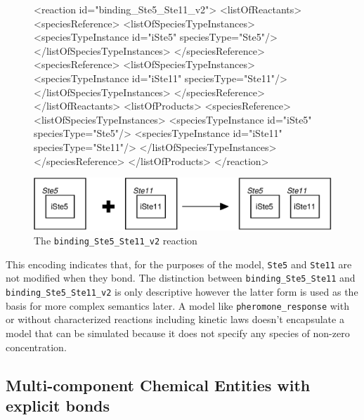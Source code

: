 \documentclass{cekarticle}
\begin{document}
\begin{figure}[h]
\begin{example}
<reaction id="binding_Ste5_Ste11_v2">
    <listOfReactants>
        <speciesReference>
            <listOfSpeciesTypeInstances>
                <speciesTypeInstance id="iSte5" speciesType="Ste5"/>
            </listOfSpeciesTypeInstances>
        </speciesReference>
        <speciesReference>
            <listOfSpeciesTypeInstances>
                <speciesTypeInstance id="iSte11" speciesType="Ste11"/>
            </listOfSpeciesTypeInstances>
        </speciesReference>
    </listOfReactants>
    <listOfProducts>
        <speciesReference>
            <listOfSpeciesTypeInstances>
                <speciesTypeInstance id="iSte5" speciesType="Ste5"/>
                <speciesTypeInstance id="iSte11" speciesType="Ste11"/>
            </listOfSpeciesTypeInstances>
        </speciesReference>
    </listOfProducts>
</reaction>
\end{example}
  \vspace*{8pt}
  \centering
  \includegraphics[scale = 0.7]{binding_Ste5_Ste11_v2.eps}
  \caption{The \texttt{binding\_Ste5\_Ste11\_v2} reaction}
  \label{fig:binding_Ste5_Ste11_v2}
\end{figure}

This encoding indicates that, for the purposes of the model,
\texttt{Ste5} and \texttt{Ste11} are not modified when they bond.
The distinction between \texttt{binding\_Ste5\_Ste11} and
\texttt{binding\_Ste5\_Ste11\_v2} is only descriptive however the
latter form is used as the basis for more complex semantics later.
A model like \texttt{pheromone\_response} with or without
characterized reactions including kinetic laws doesn't encapsulate
a model that can be simulated because it does not specify any
species of non-zero concentration.

\clearpage
\subsection{Multi-component Chemical Entities with explicit bonds}
\label{sec:explicitbonds}
\end{document}

